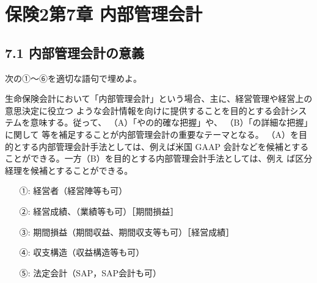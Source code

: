 \documentclass[report,gutter=10mm,fore-edge=10mm,uplatex,dvipdfmx]{jlreq}
\begin{document}
\chapter{保険2第7章 内部管理会計}
\section{7.1 内部管理会計の意義}
次の①～⑥を適切な語句で埋めよ。

生命保険会計において「内部管理会計」という場合、主に、経営管理や経営上の意思決定に役立つ
ような会計情報を向けに提供することを目的とする会計システムを意味する。従って、
（A）「やの的確な把握」や、
（B）「の詳細な把握」に関して
等を補足することが内部管理会計の重要なテーマとなる。
（A）を目的とする内部管理会計手法としては、例えば米国
GAAP 会計などを候補とすることができる。一方（B）を目的とする内部管理会計手法としては、例え
ば区分経理を候補とすることができる。
\answer{}
\begin{itemize}
\item[ ①: ] 経営者（経営陣等も可）
\item[ ②: ] 経営成績、（業績等も可）［期間損益］
\item[ ③: ] 期間損益（期間収益、期間収支等も可）［経営成績］
\item[ ④: ] 収支構造（収益構造等も可）
\item[ ⑤: ] 法定会計（SAP，SAP会計も可）
\end{itemize}
\end{document}
